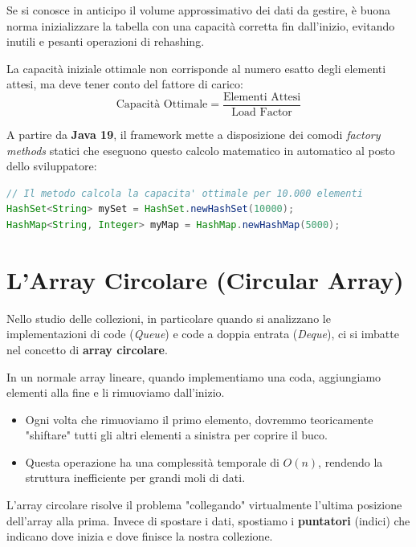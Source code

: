 \begin{bestpractice}
Se si conosce in anticipo il volume approssimativo dei dati da gestire, è buona norma inizializzare la tabella con una capacità corretta fin dall'inizio, evitando inutili e pesanti operazioni di rehashing.

La capacità iniziale ottimale non corrisponde al numero esatto degli elementi attesi, ma deve tener conto del fattore di carico:
\[ \text{Capacità Ottimale} = \frac{\text{Elementi Attesi}}{\text{Load Factor}} \]

A partire da \textbf{Java 19}, il framework mette a disposizione dei comodi \textit{factory methods} statici che eseguono questo calcolo matematico in automatico al posto dello sviluppatore:
\begin{lstlisting}[language=Java]
// Il metodo calcola la capacita' ottimale per 10.000 elementi
HashSet<String> mySet = HashSet.newHashSet(10000);
HashMap<String, Integer> myMap = HashMap.newHashMap(5000);
\end{lstlisting}
\end{bestpractice}


\section{L'Array Circolare (Circular Array)}
\label{appendix circ array}

Nello studio delle collezioni, in particolare quando si analizzano le implementazioni di code (\textit{Queue}) e code a doppia entrata (\textit{Deque}), ci si imbatte nel concetto di \textbf{array circolare}.

In un normale array lineare, quando implementiamo una coda, aggiungiamo elementi alla fine e li rimuoviamo dall'inizio. 
\begin{itemize}
    \item Ogni volta che rimuoviamo il primo elemento, dovremmo teoricamente "shiftare" tutti gli altri elementi a sinistra per coprire il buco.
    \item Questa operazione ha una complessità temporale di $O(n)$, rendendo la struttura inefficiente per grandi moli di dati.
\end{itemize}

L'array circolare risolve il problema "collegando" virtualmente l'ultima posizione dell'array alla prima. Invece di spostare i dati, spostiamo i \textbf{puntatori} (indici) che indicano dove inizia e dove finisce la nostra collezione.

